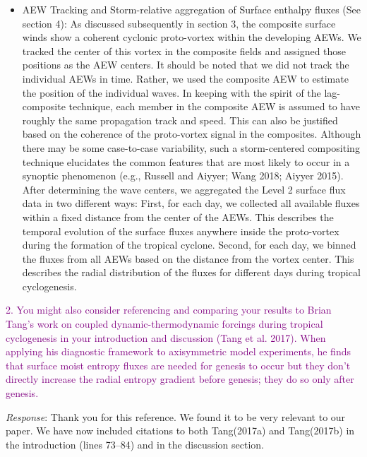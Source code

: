 \documentclass[10pt, letterpaper]{article}
\begin{document}
{\begin{tcolorbox}[sharp corners, colframe=white]
\begin{itemize}
    \item AEW Tracking and Storm-relative aggregation of Surface enthalpy fluxes (See section 4): As discussed subsequently in section 3, the composite surface winds show a coherent cyclonic proto-vortex within the developing AEWs. We tracked the center of this vortex in the composite fields and assigned those positions as the AEW centers. It should be noted that we did not track the individual AEWs in time. Rather, we used the composite AEW to estimate the position of the individual waves. In keeping with the spirit of the lag-composite technique, each member in the composite AEW is assumed to have roughly the same propagation track and speed. This can also be justified based on the coherence of the proto-vortex signal in the composites. Although there may be some case-to-case variability, such a storm-centered compositing technique elucidates the common features that are most likely to occur in a synoptic phenomenon (e.g., Russell and Aiyyer; Wang 2018; Aiyyer 2015). After determining the wave centers, we aggregated the Level 2 surface flux data in two different ways: First, for each day, we collected all available fluxes within a fixed distance from the center of the AEWs. This describes the temporal evolution of the surface fluxes anywhere inside the proto-vortex during the formation of the tropical cyclone. Second, for each day, we binned the fluxes from all AEWs based on the distance from the vortex center. This describes the radial distribution of the fluxes for different days during tropical cyclogenesis.
    

\end{itemize}
\end{tcolorbox}

\vspace{.25in}


\textcolor{purple}{2. You might also consider referencing and comparing your results to Brian Tang's work on coupled dynamic-thermodynamic forcings during tropical cyclogenesis in your introduction and discussion (Tang et al. 2017). When applying his diagnostic framework to axisymmetric model experiments, he finds that surface moist entropy fluxes are needed for genesis to occur but they don't directly increase the radial entropy gradient before genesis; they do so only after genesis.} \\



{\emph{Response}: Thank you for this reference. We found it to be very relevant to our paper. We have now included citations to both Tang(2017a) and Tang(2017b) in the introduction (lines 73--84) and in the discussion section.

}}
\end{document}
